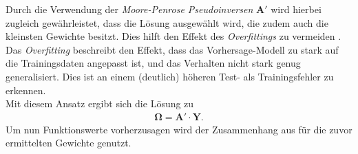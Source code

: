 Durch die Verwendung der \textit{Moore-Penrose Pseudoinversen} $\mathbf{A}'$ wird hierbei zugleich gewährleistet, dass die Lösung ausgewählt wird, die zudem auch die kleinsten Gewichte besitzt. Dies hilft den Effekt des \textit{Overfittings} zu vermeiden \cite{lowe2multi}. Das \textit{Overfitting} beschreibt den Effekt, dass das Vorhersage-Modell zu stark auf die Trainingsdaten angepasst ist, und das Verhalten nicht stark genug generalisiert. Dies ist an einem (deutlich) höheren Test- als Trainingsfehler zu erkennen.\\

Mit diesem Ansatz ergibt sich die Lösung zu
\begin{align}
\mathbf{\Omega} = \mathbf{A}' \cdot \mathbf{Y}.
\end{align}
Um nun Funktionswerte vorherzusagen wird der Zusammenhang aus \label{eq:rbf_lincomb} für die zuvor ermittelten Gewichte genutzt.